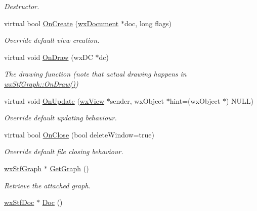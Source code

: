 \begin{DoxyCompactItemize}
\begin{DoxyCompactList}\small\item\em Destructor. \item\end{DoxyCompactList}\item 
virtual bool \hyperlink{classwxStfView_a25c3543a141c03dd0d1e96bfad3fe6ae}{OnCreate} (\hyperlink{classwxDocument}{wxDocument} $\ast$doc, long flags)
\begin{DoxyCompactList}\small\item\em Override default view creation. \item\end{DoxyCompactList}\item 
virtual void \hyperlink{classwxStfView_ae4ebec849f4a1cbf9e7a59f1495ee39f}{OnDraw} (wxDC $\ast$dc)
\begin{DoxyCompactList}\small\item\em The drawing function (note that actual drawing happens in \hyperlink{classwxStfGraph_ab22a974e78c974e314949a1f6c04f2bf}{wxStfGraph::OnDraw()}) \item\end{DoxyCompactList}\item 
virtual void \hyperlink{classwxStfView_a1b5c11da84f24f9a744348e5204a0df5}{OnUpdate} (\hyperlink{classwxView}{wxView} $\ast$sender, wxObject $\ast$hint=(wxObject $\ast$) NULL)
\begin{DoxyCompactList}\small\item\em Override default updating behaviour. \item\end{DoxyCompactList}\item 
virtual bool \hyperlink{classwxStfView_a80c5122b8253a8bf1436257faba6ce30}{OnClose} (bool deleteWindow=true)
\begin{DoxyCompactList}\small\item\em Override default file closing behaviour. \item\end{DoxyCompactList}\item 
\hyperlink{classwxStfGraph}{wxStfGraph} $\ast$ \hyperlink{classwxStfView_ac33d3e4debcc1cf17c673c2cdadf3c8b}{GetGraph} ()
\begin{DoxyCompactList}\small\item\em Retrieve the attached graph. \item\end{DoxyCompactList}\item 
\hyperlink{classwxStfDoc}{wxStfDoc} $\ast$ \hyperlink{classwxStfView_abbdb61b6a7ef0fbb029519643fbee3bb}{Doc} ()

\end{DoxyCompactItemize}
